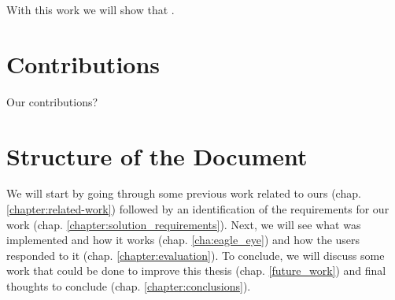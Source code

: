 With this work we will show that .




\section{Contributions} %
\label{sec:contributions}

Our contributions?



\section{Structure of the Document} %
\label{ssub:structure_of_the_document}

We will start by going through some previous work related to ours (chap. \ref{chapter:related-work}) followed by an identification of the requirements for our work (chap. \ref{chapter:solution_requirements}). Next, we will see what was implemented and how it works (chap. \ref{cha:eagle_eye}) and how the users responded to it (chap. \ref{chapter:evaluation}). To conclude, we will discuss some work that could be done to improve this thesis (chap. \ref{future_work}) and final thoughts to conclude (chap. \ref{chapter:conclusions}).


